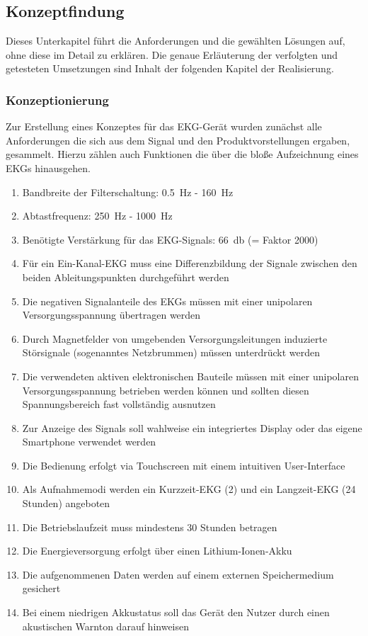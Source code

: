 
\subsection{Konzeptfindung}

Dieses Unterkapitel führt die Anforderungen und die gewählten Lösungen auf, ohne diese im Detail zu erklären. Die genaue Erläuterung der verfolgten und getesteten Umsetzungen sind Inhalt der folgenden Kapitel der Realisierung. 

\subsubsection{Konzeptionierung}

Zur Erstellung eines Konzeptes für das EKG-Gerät wurden zunächst alle Anforderungen die sich aus dem Signal und den Produktvorstellungen ergaben, gesammelt. Hierzu zählen auch Funktionen die über die bloße Aufzeichnung eines EKGs hinausgehen.

\begin{enumerate}
\item Bandbreite der Filterschaltung: \SI{0.5}{\hertz} - \SI{160}{\hertz}
\item Abtastfrequenz: \SI{250}{\hertz} - \SI{1000}{\hertz}
\item Benötigte Verstärkung für das EKG-Signals: \SI{66}{\decibel} (= Faktor 2000)
\item Für ein Ein-Kanal-EKG muss eine Differenzbildung der Signale zwischen den beiden Ableitungspunkten durchgeführt werden
\item Die negativen Signalanteile des EKGs müssen mit einer unipolaren Versorgungsspannung übertragen werden
\item Durch Magnetfelder von umgebenden Versorgungsleitungen induzierte Störsignale (sogenanntes Netzbrummen) müssen unterdrückt werden
\item Die verwendeten aktiven elektronischen Bauteile müssen mit einer unipolaren Versorgungsspannung betrieben werden können und sollten diesen Spannungsbereich fast vollständig ausnutzen
\item Zur Anzeige des Signals soll wahlweise ein integriertes Display oder das eigene Smartphone verwendet werden
\item Die Bedienung erfolgt via Touchscreen mit einem intuitiven User-Interface
\item Als Aufnahmemodi werden ein Kurzzeit-EKG (\SI{2}{\min}) und ein Langzeit-EKG (24 Stunden) angeboten
\item Die Betriebslaufzeit muss mindestens 30 Stunden betragen
\item Die Energieversorgung erfolgt über einen Lithium-Ionen-Akku
\item Die aufgenommenen Daten werden auf einem externen Speichermedium gesichert
\item Bei einem niedrigen Akkustatus soll das Gerät den Nutzer durch einen akustischen Warnton darauf hinweisen
\end{enumerate}

